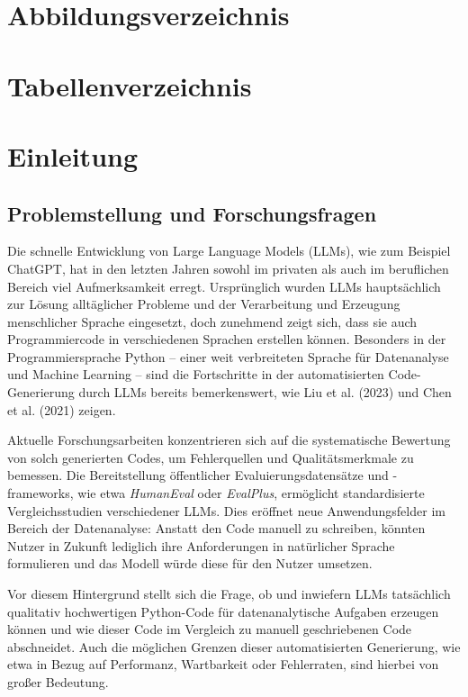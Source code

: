 \documentclass[11pt,a4paper]{article}
\begin{document}
\section{Abbildungsverzeichnis}
\label{sec:abbildungsverzeichnis}
\listoffigures
\newpage
\section{Tabellenverzeichnis}
\label{sec:tabellenverzeichnis}
\listoftables
\newpage


\section{Einleitung}
\label{sec:einleitung}
\subsection{Problemstellung und Forschungsfragen}
\label{sec:forschungsfragen}
Die schnelle Entwicklung von Large Language Models (LLMs), wie zum Beispiel ChatGPT, hat in den letzten Jahren sowohl im privaten als auch im beruflichen Bereich viel Aufmerksamkeit erregt. Ursprünglich wurden LLMs hauptsächlich zur Lösung alltäglicher Probleme und der Verarbeitung und Erzeugung menschlicher Sprache eingesetzt, doch zunehmend zeigt sich, dass sie auch Programmiercode in verschiedenen Sprachen erstellen können. Besonders in der Programmiersprache Python – einer weit verbreiteten Sprache für Datenanalyse und Machine Learning – sind die Fortschritte in der automatisierten Code-Generierung durch LLMs bereits bemerkenswert, wie Liu et al. (2023)\cite{NEURIPS2023_43e9d647} und Chen et al. (2021)\cite{chen2021evaluatinglargelanguagemodels} zeigen.

Aktuelle Forschungsarbeiten konzentrieren sich auf die systematische Bewertung von solch generierten Codes, um Fehlerquellen und Qualitätsmerkmale zu bemessen. Die Bereitstellung öffentlicher Evaluierungsdatensätze und -frameworks, wie etwa \emph{HumanEval}\cite{chen2021evaluatinglargelanguagemodels} oder \emph{EvalPlus}\cite{evalplus}, ermöglicht standardisierte Vergleichsstudien verschiedener LLMs. Dies eröffnet neue Anwendungsfelder im Bereich der Datenanalyse: Anstatt den Code manuell zu schreiben, könnten Nutzer in Zukunft lediglich ihre Anforderungen in natürlicher Sprache formulieren und das Modell würde diese für den Nutzer umsetzen.

Vor diesem Hintergrund stellt sich die Frage, ob und inwiefern LLMs tatsächlich qualitativ hochwertigen Python-Code für datenanalytische Aufgaben erzeugen können und wie dieser Code im Vergleich zu manuell geschriebenen Code abschneidet. Auch die möglichen Grenzen dieser automatisierten Generierung, wie etwa in Bezug auf Performanz, Wartbarkeit oder Fehlerraten, sind hierbei von großer Bedeutung.
\end{document}
